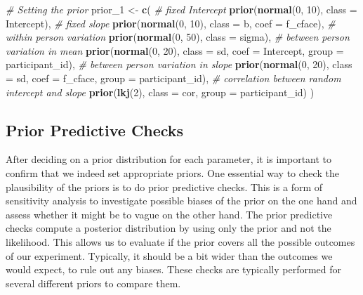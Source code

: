 \documentclass[
  doc,12pt,floatsintext]{apa7}
\newenvironment{Shaded}{\begin{snugshade}}{\end{snugshade}}
\newcommand{\AttributeTok}[1]{\textcolor[rgb]{0.13,0.29,0.53}{#1}}
\newcommand{\CommentTok}[1]{\textcolor[rgb]{0.56,0.35,0.01}{\textit{#1}}}
\newcommand{\DecValTok}[1]{\textcolor[rgb]{0.00,0.00,0.81}{#1}}
\newcommand{\FunctionTok}[1]{\textcolor[rgb]{0.13,0.29,0.53}{\textbf{#1}}}
\newcommand{\NormalTok}[1]{#1}
\newcommand{\OtherTok}[1]{\textcolor[rgb]{0.56,0.35,0.01}{#1}}
\begin{document}
\begin{Shaded}
\begin{Highlighting}[]
\CommentTok{\# Setting the prior}
\NormalTok{prior\_1 }\OtherTok{\textless{}{-}} \FunctionTok{c}\NormalTok{(}
  \CommentTok{\# fixed Intercept}
  \FunctionTok{prior}\NormalTok{(}\FunctionTok{normal}\NormalTok{(}\DecValTok{0}\NormalTok{, }\DecValTok{10}\NormalTok{), }\AttributeTok{class =}\NormalTok{ Intercept), }
  \CommentTok{\# fixed slope}
  \FunctionTok{prior}\NormalTok{(}\FunctionTok{normal}\NormalTok{(}\DecValTok{0}\NormalTok{, }\DecValTok{10}\NormalTok{), }\AttributeTok{class =}\NormalTok{ b, }\AttributeTok{coef =}\NormalTok{ f\_cface), }
  \CommentTok{\# within person variation}
  \FunctionTok{prior}\NormalTok{(}\FunctionTok{normal}\NormalTok{(}\DecValTok{0}\NormalTok{, }\DecValTok{50}\NormalTok{), }\AttributeTok{class =}\NormalTok{ sigma), }
  \CommentTok{\# between person variation in mean}
  \FunctionTok{prior}\NormalTok{(}\FunctionTok{normal}\NormalTok{(}\DecValTok{0}\NormalTok{, }\DecValTok{20}\NormalTok{), }\AttributeTok{class =}\NormalTok{ sd, }\AttributeTok{coef =}\NormalTok{ Intercept, }
        \AttributeTok{group =}\NormalTok{ participant\_id), }
  \CommentTok{\# between person variation in slope}
  \FunctionTok{prior}\NormalTok{(}\FunctionTok{normal}\NormalTok{(}\DecValTok{0}\NormalTok{, }\DecValTok{20}\NormalTok{), }\AttributeTok{class =}\NormalTok{ sd, }\AttributeTok{coef =}\NormalTok{ f\_cface, }
        \AttributeTok{group =}\NormalTok{ participant\_id), }
  \CommentTok{\# correlation between random intercept and slope}
  \FunctionTok{prior}\NormalTok{(}\FunctionTok{lkj}\NormalTok{(}\DecValTok{2}\NormalTok{), }\AttributeTok{class =}\NormalTok{ cor, }\AttributeTok{group =}\NormalTok{ participant\_id)}
\NormalTok{) }
\end{Highlighting}
\end{Shaded}

\subsection{Prior Predictive Checks}\label{prior-predictive-checks}

After deciding on a prior distribution for each parameter, it is important to confirm that we indeed set appropriate priors. One essential way to check the plausibility of the priors is to do prior predictive checks. This is a form of sensitivity analysis to investigate possible biases of the prior on the one hand and assess whether it might be to vague on the other hand. The prior predictive checks compute a posterior distribution by using only the prior and not the likelihood. This allows us to evaluate if the prior covers all the possible outcomes of our experiment. Typically, it should be a bit wider than the outcomes we would expect, to rule out any biases. These checks are typically performed for several different priors to compare them.
\end{document}
